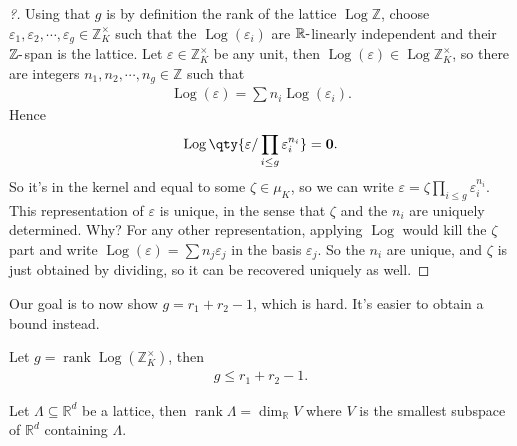 \begin{proof}[?]

Using that \(g\) is by definition the rank of the lattice
\(\operatorname{Log}{\mathbb{Z}}\), choose
\({ {\varepsilon}_1, {\varepsilon}_2, \cdots, {\varepsilon}_{g}}\in {\mathbb{Z}}_K^{\times}\)
such that the \(\operatorname{Log}(\varepsilon_i)\) are
\({\mathbb{R}}{\hbox{-}}\)linearly independent and their
\({\mathbb{Z}}{\hbox{-}}\)span is the lattice. Let
\(\varepsilon\in {\mathbb{Z}}_K^{\times}\) be any unit, then
\(\operatorname{Log}(\varepsilon) \in \operatorname{Log}{\mathbb{Z}}_K^{\times}\),
so there are integers
\({ {n}_1, {n}_2, \cdots, {n}_{g}}\in {\mathbb{Z}}\) such that
\begin{align*}
\operatorname{Log}(\varepsilon) = \sum n_i \operatorname{Log}(\varepsilon_i)
.\end{align*}
Hence
\begin{align*}
\operatorname{Log}\qty{ \varepsilon/ \prod_{i\leq g} \varepsilon_i^{n_i} } = \mathbf{0}
.\end{align*}
So it's in the kernel and equal to some \(\zeta\in \mu_K\), so we can
write \(\varepsilon= \zeta \prod_{i\leq g} \varepsilon_i^{n_i}\). This
representation of \(\varepsilon\) is unique, in the sense that \(\zeta\)
and the \(n_i\) are uniquely determined. Why? For any other
representation, applying \(\operatorname{Log}\) would kill the \(\zeta\)
part and write
\(\operatorname{Log}(\varepsilon) = \sum n_{j} \varepsilon_j\) in the
basis \(\varepsilon_j\). So the \(n_i\) are unique, and \(\zeta\) is
just obtained by dividing, so it can be recovered uniquely as well.

\end{proof}

\begin{remark}

Our goal is to now show \(g=r_1 + r_2-1\), which is hard. It's easier to
obtain a bound instead.

\end{remark}

\begin{proposition}

Let
\(g = \operatorname{rank}\operatorname{Log}({\mathbb{Z}}_K^{\times})\),
then
\begin{align*}
g\leq r_1 + r_2 - 1
.\end{align*}

\end{proposition}

\begin{lemma}[?]

Let \(\Lambda \subseteq {\mathbb{R}}^d\) be a lattice, then
\(\operatorname{rank}\Lambda = \dim_{\mathbb{R}}V\) where \(V\) is the
smallest subspace of \({\mathbb{R}}^d\) containing \(\Lambda\).

\end{lemma}

